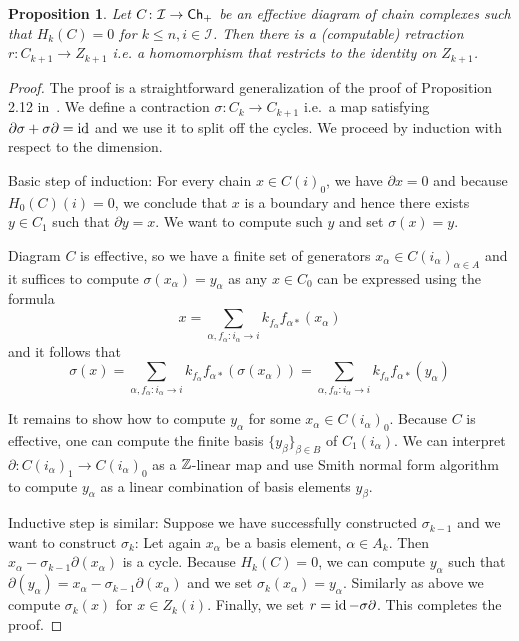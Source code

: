 \documentclass[12pt,a4wide]{article}
\theoremstyle{plain}
\newtheorem{prop}[thm]{Proposition}
\theoremstyle{definition}
\newcommand{\thedimm}{{k}}
\renewcommand\:{\colon}
\def\bo{\partial} %
\def\s{\sigma}
\newcommand{\dC}{{C}}
\newcommand{\dZ}{Z}
\newcommand{\dH}{H}
\newcommand{\icat}{\mathcal I}
\begin{document}
\begin{prop}\label{prop:gen}
Let $\dC\colon \icat \to \Ch_+$ be an effective diagram of chain complexes such that $\dH_\thedimm (\dC) = 0$ for $\thedimm \leq n, i\in \icat$. Then there is a (computable) retraction $r \colon \dC_{\thedimm+1} \to \dZ_{\thedimm+1}$ i.e. a homomorphism that restricts to the identity on $\dZ_{\thedimm+1}$.
\end{prop}
\begin{proof}
The proof is a straightforward generalization of the proof of Proposition 2.12 in~\cite{aslep}. We define a contraction $\s\: \dC_{\thedimm} \to \dC_{\thedimm+1}$ i.e.\ a map satisfying $\bo\s + \s \bo = \id$ and we use it to split off the cycles.  We proceed by induction with respect to the dimension. 

Basic step of induction: For every chain $x \in \dC(i)_0 $, we have $\bo x = 0$ and because $\dH_0(\dC)(i) = 0$, we conclude that $x$ is a boundary and hence there exists $y \in \dC_1$ such that $\bo y = x$. We want to compute such $y$ and set $\s(x) = y$.

Diagram $\dC$ is effective, so we have a  finite set of generators $x_{\alpha} \in \dC(i_{\alpha})_{\alpha \in A}$ and it suffices to compute $\s(x_\alpha) = y_\alpha$ as any $x \in \dC_0$ can be expressed using the formula
\[
x= \sum\limits_{\alpha, f_{\alpha}\: i_\alpha \to i} k_{f_{\alpha}} f_{\alpha*} (x_\alpha)
\]
and it follows that
\[
\s(x)= \sum\limits_{\alpha, f_{\alpha}\: i_\alpha \to i} k_{f_{\alpha}} f_{\alpha*} (\s(x_\alpha)) = \sum\limits_{\alpha, f_{\alpha}\: i_\alpha \to i} k_{f_{\alpha}} f_{\alpha*} (y_\alpha) 
\]

It remains to show how to compute $y_\alpha$ for some $x_\alpha \in \dC (i_\alpha)_0$. Because $\dC$ is effective, one can compute the finite basis $\{y_\beta \}_{ \beta \in B}$ of $\dC_1(i_\alpha)$. We can interpret $\bo\: \dC(i_{\alpha})_1 \to \dC(i_{\alpha})_0$ as a $\mathbb Z$-linear map and use Smith normal form algorithm to compute $y_\alpha$ as a linear combination of basis elements $y_\beta$.

Inductive step is similar: Suppose we have successfully constructed $\s_{\thedimm-1}$ and we want to construct $\s_{\thedimm}$: Let again $x_{\alpha}$ be a basis element, $\alpha \in A_{\thedimm}$. Then $x_{\alpha} - \s_{\thedimm-1}\bo(x_{\alpha})$ is a cycle. Because $\dH_\thedimm(\dC) = 0$, we can compute $y_\alpha$ such that $\bo(y_\alpha) = x_{\alpha} - \s_{\thedimm-1} \bo(x_{\alpha})$ and we set $\s_\thedimm(x_{\alpha}) = y_{\alpha}$. Similarly as above we compute $\s_k (x)$ for $x \in \dZ_k (i)$. Finally, we set $r = \id - \s\bo$. This completes the proof. 
\end{proof}
\end{document}
